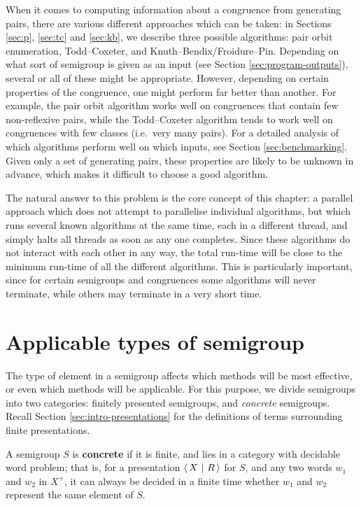 When it comes to computing information about a congruence from generating pairs,
there are various different approaches which can be taken: in Sections
\ref{sec:p}, \ref{sec:tc} and \ref{sec:kb}, we describe three possible
algorithms: pair orbit enumeration, Todd--Coxeter, and Knuth--Bendix/Froidure--Pin.
Depending on what sort of semigroup is given as an input (see Section
\ref{sec:program-outputs}), several
or all of these might be appropriate.  However, depending on certain properties
of the congruence, one might perform far better than another.  For example, the
pair orbit algorithm works well on congruences that contain few non-reflexive
pairs, while the Todd--Coxeter algorithm tends to work well on congruences with
few classes (i.e.~very many pairs).  For a detailed analysis of which algorithms
perform well on which inputs, see Section \ref{sec:benchmarking}.  Given
only a set of generating pairs, these properties are likely to be unknown in
advance, which makes it difficult to choose a good algorithm.

The natural answer to this problem is the core concept of this chapter: a
parallel approach which does not attempt to parallelise individual algorithms,
but which runs several known algorithms at the same time, each in a different
thread, and simply halts all threads as soon as any one completes.  Since these
algorithms do not interact with each other in any way, the total run-time will
be close to the minimum run-time of all the different algorithms.  This is
particularly important, since for certain semigroups and congruences some
algorithms will never terminate, while others may terminate in a very short
time.

\section{Applicable types of semigroup}
\label{sec:applicable-types-of-semigroup}

The type of element in a semigroup affects which methods will be most effective,
or even which methods will be applicable.  For this purpose, we divide
semigroups into two categories: finitely presented semigroups, and
\textit{concrete} semigroups.  Recall Section \ref{sec:intro-presentations} for
the definitions of terms surrounding finite presentations.

\begin{definition}
  \label{def:concrete}
  A semigroup $S$ is \textbf{concrete} if it is finite, and lies in a category
  with decidable word problem; that is, for a presentation $\left\langle\,X ~\middle|~ R\,\right\rangle$ for $S$, and
  any two words $w_1$ and $w_2$ in $X^+$, it can always be decided in a finite
  time whether $w_1$ and $w_2$ represent the same element of $S$.
\end{definition}

